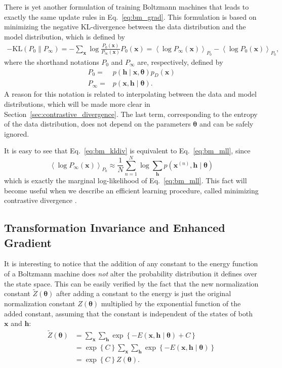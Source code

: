 \documentclass[dissertation,nocontribution,draft*]{aaltoseries}
\newcommand{\vect}[1]{\mathbf{#1}}
\newcommand{\vects}[1]{\boldsymbol{#1}}
\newcommand{\vh}[0]{\vect{h}}
\newcommand{\vx}[0]{\vect{x}}
\newcommand{\TT}[0]{{\vects{\theta}}}
\newcommand{\KL}[0]{\text{KL}}
\begin{document}
There is yet another formulation of training Boltzmann
machines that leads to exactly the same update rules in
Eq.~\eqref{eq:bm_grad}. This formulation is based on
minimizing the negative KL-divergence between the
data distribution and the model distribution, which is
defined by
\begin{align}
    \label{eq:bm_kldiv}
    -\KL(P_0 \| P_\infty) = -\sum_{\vx} \log
    \frac{P_0(\vx)}{P_\infty(\vx)} P_0(\vx) =
    \left<\log P_\infty(\vx) \right>_{P_0} - \left< \log P_0
    (\vx) \right>_{P_0},
\end{align}
where the shorthand notations $P_0$ and $P_\infty$ are,
respectively, 
defined by
\begin{align*}
    P_0 =& p\left(\vh \mid \vx, \TT\right)p_D\left(\vx\right)
    \\
    P_\infty =& p\left(\vx, \vh \mid \TT\right).
\end{align*}
A reason for this notation is related to interpolating
between the data and model distributions, which will be made
more clear in Section~\ref{sec:contrastive_divergence}. The
last term, corresponding to the entropy of the data
distribution, does not depend on the parameters $\TT$ and
can be safely ignored.

It is easy to see that Eq.~\eqref{eq:bm_kldiv} is equivalent
to Eq.~\eqref{eq:bm_mll}, since
\[
\left< \log P_\infty(\vx) \right>_{P_0} \approx \frac{1}{N}
\sum_{n=1}^N \log \sum_{\vh} p(\vx^{(n)}, \vh \mid \TT)
\]
which is exactly the marginal log-likelihood of
Eq.~\eqref{eq:bm_mll}. This fact will become useful when we
describe an efficient learning procedure, called minimizing
contrastive divergence \citep{Hinton2002}.

\subsection{Transformation Invariance and Enhanced Gradient}
\label{sec:enhanced_grad}

It is interesting to notice that the addition of any constant
to the energy function of a Boltzmann machine does
\textit{not} alter the probability distribution it defines
over the state space. This can be easily verified by the
fact that the new normalization constant $\tilde{Z}(\TT)$
after adding a constant to the energy is just the original
normalization constant $Z(\TT)$ multiplied by the exponential
function of the added constant, assuming that the constant
is independent of the states of both $\vx$ and $\vh$:
\begin{align*}
    \tilde{Z}(\TT) &= \sum_\vx \sum_\vh \exp\left\{
    -E(\vx, \vh \mid \TT) + C \right\} \\
    &= \exp\left\{ C \right\} \sum_\vx \sum_\vh \exp\left\{
    -E(\vx, \vh \mid \TT) \right\} \\
    &= \exp\left\{ C \right\} Z(\TT).
\end{align*}
\end{document}
